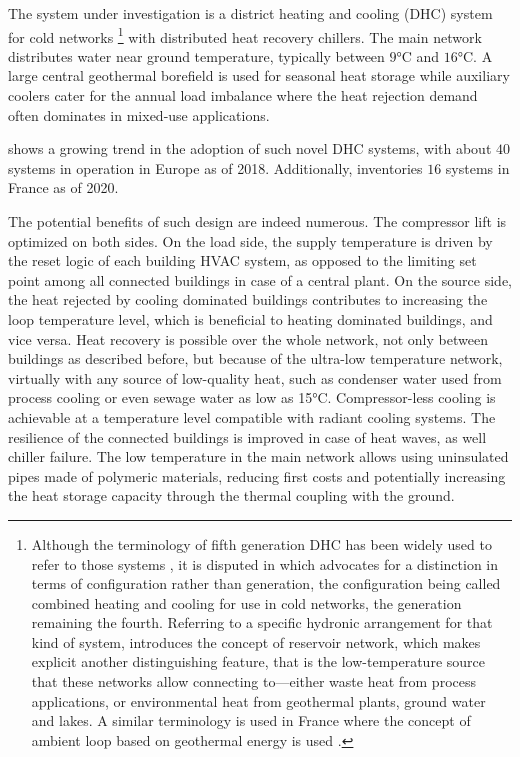 The system under investigation is a district heating and cooling (DHC) system for cold networks%
\footnote{%
Although the terminology of fifth generation DHC has been widely used to refer to those systems \citep{Buffa2019}, it is disputed in \citep{Sulzer2021} which advocates for a distinction in terms of configuration rather than generation, the configuration being called combined heating and cooling for use in cold networks, the generation remaining the fourth.
Referring to a specific hydronic arrangement for that kind of system, \cite{Sommer2020} introduces the concept of reservoir network, which makes explicit another distinguishing feature, that is the low-temperature source that these networks allow connecting to---either waste heat from process applications, or environmental heat from geothermal plants, ground water and lakes.
A similar terminology is used in France where the concept of ambient loop based on geothermal energy is used \citep{Afpg2020}.}
with distributed heat recovery chillers.
The main network distributes water near ground temperature, typically between $9$°C and $16$°C. A large central geothermal borefield is used for seasonal heat storage while auxiliary coolers cater for the annual load imbalance where the heat rejection demand often dominates in mixed-use applications.

\cite{Buffa2019} shows a growing trend in the adoption of such novel DHC systems, with about $40$ systems in operation in Europe as of 2018.
Additionally, \cite{Afpg2020} inventories $16$ systems in France as of 2020.

The potential benefits of such design are indeed numerous.
The compressor lift is optimized on both sides. On the load side, the supply temperature is driven by the reset logic of each building HVAC system, as opposed to the limiting set point among all connected buildings in case of a central plant. On the source side, the heat rejected by cooling dominated buildings contributes to increasing the loop temperature level, which is beneficial to heating dominated buildings, and vice versa.
Heat recovery is possible over the whole network, not only between buildings as described before, but because of the ultra-low temperature network, virtually with any source of low-quality heat, such as condenser water used from process cooling or even sewage water as low as 15°C.
Compressor-less cooling is achievable at a temperature level compatible with radiant cooling systems.
The resilience of the connected buildings is improved in case of heat waves, as well chiller failure.
The low temperature in the main network allows using uninsulated pipes made of polymeric materials, reducing first costs and potentially increasing the heat storage capacity through the thermal coupling with the ground.

